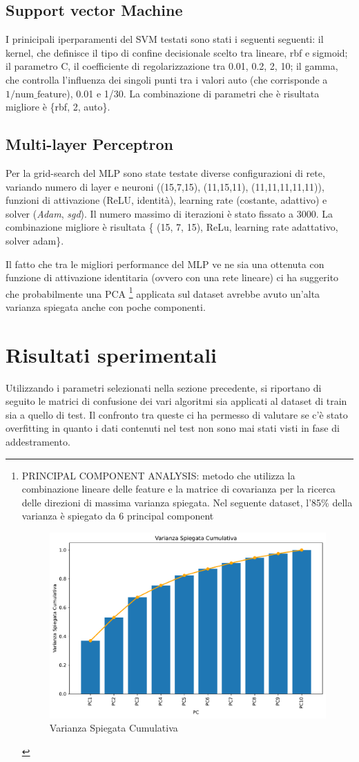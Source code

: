 \documentclass[conference]{IEEEtran}
\begin{document}
\subsection{Support vector Machine}
I prinicipali iperparamenti del SVM testati sono stati i seguenti seguenti: il kernel, che definisce il tipo di confine decisionale scelto tra lineare, rbf e sigmoid; il parametro C, il coefficiente di regolarizzazione tra 0.01, 0.2, 2, 10; il gamma, che controlla l’influenza dei singoli punti tra i valori auto (che corrisponde a $1 / \text{num\_feature}$), 0.01 e 1/30. La combinazione di parametri che è risultata migliore è \{rbf, 2, auto\}.

\subsection{Multi-layer Perceptron}
Per la grid-search del MLP sono state testate diverse configurazioni di rete, variando numero di layer e neuroni ((15,7,15), (11,15,11), (11,11,11,11,11)), funzioni di attivazione (ReLU, identità), learning rate (costante, adattivo) e solver (\textit{Adam}, \textit{sgd}). Il numero massimo di iterazioni è stato fissato a 3000.
La combinazione migliore è risultata \{ (15, 7, 15), ReLu, learning rate adattativo, solver adam\}.

Il fatto che tra le migliori performance del MLP ve ne sia una ottenuta con funzione di attivazione identitaria (ovvero con una rete lineare) ci ha suggerito che probabilmente una PCA \footnote{PRINCIPAL COMPONENT ANALYSIS: metodo che utilizza la combinazione lineare delle feature e la matrice di covarianza per la ricerca delle direzioni di massima varianza spiegata. Nel seguente dataset, l'85\% della varianza è spiegato da 6 principal component
\begin{figure} [H]
    \centering
    \includegraphics[width=0.3\linewidth]{varianzaSpiegataCumulativa.pdf}
    \caption{\footnotesize Varianza Spiegata Cumulativa }
    \label{varianzaSpiegataCumulativa}
\end{figure}}
applicata sul dataset avrebbe avuto un'alta varianza spiegata anche con poche componenti.


\section{Risultati sperimentali}
Utilizzando i parametri selezionati nella sezione precedente, si riportano di seguito le matrici di confusione dei vari algoritmi sia applicati al dataset di train sia a quello di test. Il confronto tra queste ci ha permesso di valutare se c'è stato overfitting in quanto i dati contenuti nel test non sono mai stati visti in fase di addestramento. 
\end{document}
